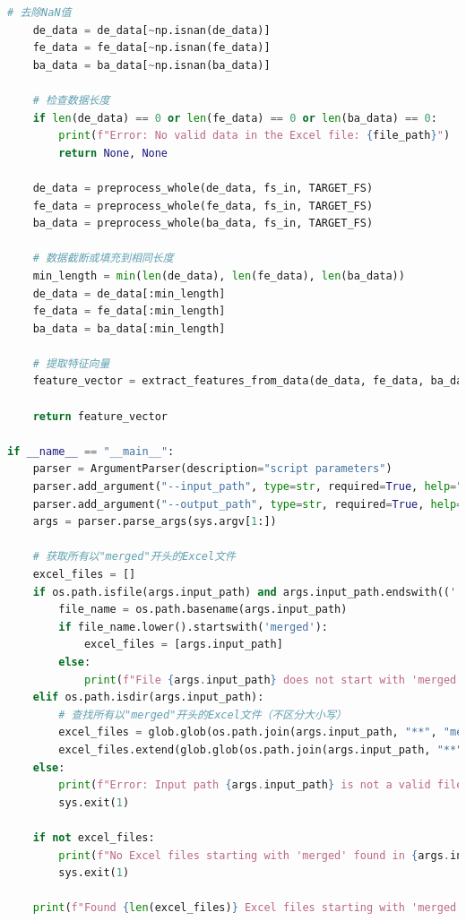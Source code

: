 \documentclass[a4paper]{CPIPC}
\numberwithin{equation}{section}
\begin{document}
\begin{lstlisting}[language=Python, caption=Feature Extraction]
    # 去除NaN值
    de_data = de_data[~np.isnan(de_data)]
    fe_data = fe_data[~np.isnan(fe_data)]   
    ba_data = ba_data[~np.isnan(ba_data)]
    
    # 检查数据长度
    if len(de_data) == 0 or len(fe_data) == 0 or len(ba_data) == 0:
        print(f"Error: No valid data in the Excel file: {file_path}")
        return None, None
    
    de_data = preprocess_whole(de_data, fs_in, TARGET_FS)
    fe_data = preprocess_whole(fe_data, fs_in, TARGET_FS)
    ba_data = preprocess_whole(ba_data, fs_in, TARGET_FS)
    
    # 数据截断或填充到相同长度
    min_length = min(len(de_data), len(fe_data), len(ba_data))
    de_data = de_data[:min_length]
    fe_data = fe_data[:min_length]
    ba_data = ba_data[:min_length]
    
    # 提取特征向量
    feature_vector = extract_features_from_data(de_data, fe_data, ba_data, rpm)
    
    return feature_vector

if __name__ == "__main__":
    parser = ArgumentParser(description="script parameters")
    parser.add_argument("--input_path", type=str, required=True, help="Path to the input Excel file or directory")
    parser.add_argument("--output_path", type=str, required=True, help="Path to the output Excel file")
    args = parser.parse_args(sys.argv[1:])

    # 获取所有以"merged"开头的Excel文件
    excel_files = []
    if os.path.isfile(args.input_path) and args.input_path.endswith(('.xlsx', '.xls')):
        file_name = os.path.basename(args.input_path)
        if file_name.lower().startswith('merged'):
            excel_files = [args.input_path]
        else:
            print(f"File {args.input_path} does not start with 'merged', skipping")
    elif os.path.isdir(args.input_path):
        # 查找所有以"merged"开头的Excel文件（不区分大小写）
        excel_files = glob.glob(os.path.join(args.input_path, "**", "merged*.xlsx"), recursive=True)
        excel_files.extend(glob.glob(os.path.join(args.input_path, "**", "merged*.xls"), recursive=True))
    else:
        print(f"Error: Input path {args.input_path} is not a valid file or directory")
        sys.exit(1)
    
    if not excel_files:
        print(f"No Excel files starting with 'merged' found in {args.input_path}")
        sys.exit(1)
    
    print(f"Found {len(excel_files)} Excel files starting with 'merged' to process")
    

\end{lstlisting}
\end{document}
